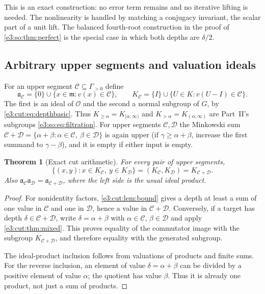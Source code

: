 \documentclass[11pt,letterpaper]{article}
\numberwithin{equation}{section}
\newtheorem{theorem}{Theorem}[section]
\theoremstyle{definition}
\theoremstyle{remark}
\newcommand{\OO}{\mathcal O}
\newcommand{\mm}{\mathfrak m}
\newcommand{\comm}[2]{\left(#1,#2\right)}
\newcommand{\commset}[2]{\{\comm{x}{y}:x\in #1,\ y\in #2\}}
\begin{document}
This is an exact construction: no error term remains and no iterative lifting is
needed. The nonlinearity is handled by matching a conjugacy invariant, the
scalar part of a unit lift. The balanced fourth-root construction in the proof
of \cref{e3:so:thm:perfect} is the special case in which both depths are
$\delta/2$.

\subsection{Arbitrary upper segments and valuation ideals}

For an upper segment $\mathcal C\subseteq\Gamma_{>0}$ define
\begin{equation}\label{e3:cut:eq:cuts}
 \mathfrak a_{\mathcal C}=\{0\}\cup\{x\in\mm:v(x)\in\mathcal C\},\qquad
 K_{\mathcal C}=\{I\}\cup\{U\in K:v(U-I)\in\mathcal C\}.
\end{equation}
The first is an ideal of $\OO$ and the second a normal subgroup of $G$, by
\cref{e3:cut:eq:depthbasic}. Thus $K_{\ge\alpha}=K_{[\alpha,\infty)}$ and
$K_{>\alpha}=K_{(\alpha,\infty)}$ are Part~II's subgroups
\cref{e3:so:eq:filtration}. For upper segments $\mathcal C,\mathcal D$ the
Minkowski sum
$\mathcal C+\mathcal D=\{\alpha+\beta:\alpha\in\mathcal C,\ \beta\in\mathcal D\}$
is again upper (if $\gamma\ge\alpha+\beta$, increase the first summand to
$\gamma-\beta$), and it is empty if either input is empty.

\begin{theorem}[Exact cut arithmetic]\label{e3:cut:thm:cuts}
For every pair of upper segments,
\begin{equation}\label{e3:cut:eq:cutcomm}
 \commset{K_{\mathcal C}}{K_{\mathcal D}}=\comm{K_{\mathcal C}}{K_{\mathcal D}}
 =K_{\mathcal C+\mathcal D}.
\end{equation}
Also $\mathfrak a_{\mathcal C}\mathfrak a_{\mathcal D}=\mathfrak a_{\mathcal C+\mathcal D}$,
where the left side is the usual ideal product.
\end{theorem}
\begin{proof}
For nonidentity factors, \cref{e3:cut:lem:bound} gives a depth at least a sum of
one value in $\mathcal C$ and one in $\mathcal D$, hence a value in
$\mathcal C+\mathcal D$. Conversely, if a target has depth
$\delta\in\mathcal C+\mathcal D$, write $\delta=\alpha+\beta$ with
$\alpha\in\mathcal C$, $\beta\in\mathcal D$ and apply \cref{e3:cut:thm:mixed}.
This proves equality of the commutator image with the subgroup
$K_{\mathcal C+\mathcal D}$, and therefore equality with the generated
subgroup.

The ideal-product inclusion follows from valuations of products and finite
sums. For the reverse inclusion, an element of value $\delta=\alpha+\beta$ can
be divided by a positive element of value $\alpha$; the quotient has value
$\beta$. Thus it is already one product, not just a sum of products.
\end{proof}
\end{document}

